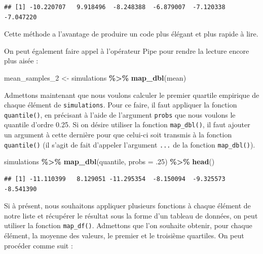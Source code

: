\documentclass[
  11pt,
]{book}
\newenvironment{Shaded}{\begin{snugshade}}{\end{snugshade}}
\newcommand{\DataTypeTok}[1]{\textcolor[rgb]{0.13,0.29,0.53}{#1}}
\newcommand{\DecValTok}[1]{\textcolor[rgb]{0.00,0.00,0.81}{#1}}
\newcommand{\FloatTok}[1]{\textcolor[rgb]{0.00,0.00,0.81}{#1}}
\newcommand{\KeywordTok}[1]{\textcolor[rgb]{0.13,0.29,0.53}{\textbf{#1}}}
\newcommand{\NormalTok}[1]{#1}
\newcommand{\OperatorTok}[1]{\textcolor[rgb]{0.81,0.36,0.00}{\textbf{#1}}}
\newcommand{\StringTok}[1]{\textcolor[rgb]{0.31,0.60,0.02}{#1}}
\numberwithin{equation}{section}
\numberwithin{countremarque}{section}
\begin{document}
\begin{lstlisting}
## [1] -10.220707   9.918496  -8.248388  -6.879007  -7.120338  -7.047220
\end{lstlisting}

Cette méthode a l'avantage de produire un code plus élégant et plus rapide à lire.

On peut également faire appel à l'opérateur Pipe pour rendre la lecture encore plus aisée :

\begin{Shaded}
\begin{Highlighting}[]
\NormalTok{mean\_samples\_}\DecValTok{2}\NormalTok{ \textless{}{-}}\StringTok{ }
\StringTok{  }\NormalTok{simulations }\OperatorTok{\%\textgreater{}\%}\StringTok{ }
\StringTok{  }\KeywordTok{map\_dbl}\NormalTok{(mean)}
\end{Highlighting}
\end{Shaded}

Admettons maintenant que nous voulons calculer le premier quartile empirique de chaque élément de \texttt{simulations}. Pour ce faire, il faut appliquer la fonction \texttt{quantile()}, en précisant à l'aide de l'argument \texttt{probs} que nous voulons le quantile d'ordre 0.25. Si on désire utiliser la fonction \texttt{map\_dbl()}, il faut ajouter un argument à cette dernière pour que celui-ci soit transmis à la fonction \texttt{quantile()} (il s'agit de fait d'appeler l'argument \texttt{...} de la fonction \texttt{map\_dbl()}).

\begin{Shaded}
\begin{Highlighting}[]
\NormalTok{simulations }\OperatorTok{\%\textgreater{}\%}\StringTok{ }
\StringTok{  }\KeywordTok{map\_dbl}\NormalTok{(quantile, }\DataTypeTok{probs =} \FloatTok{.25}\NormalTok{) }\OperatorTok{\%\textgreater{}\%}\StringTok{ }
\StringTok{  }\KeywordTok{head}\NormalTok{()}
\end{Highlighting}
\end{Shaded}

\begin{lstlisting}
## [1] -11.110399   8.129051 -11.295354  -8.150094  -9.325573  -8.541390
\end{lstlisting}

Si à présent, nous souhaitons appliquer plusieurs fonctions à chaque élément de notre liste et récupérer le résultat sous la forme d'un tableau de données, on peut utiliser la fonction \texttt{map\_df()}. Admettons que l'on souhaite obtenir, pour chaque élément, la moyenne des valeurs, le premier et le troisième quartiles. On peut procéder comme suit :
\end{document}
